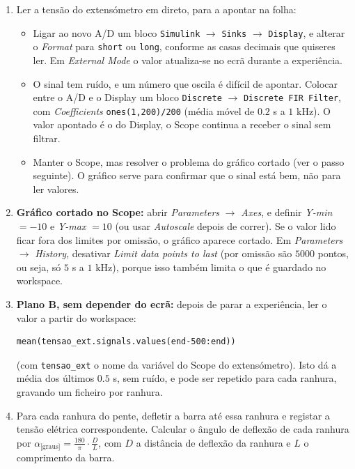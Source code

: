 \documentclass[a4paper,11pt]{article}
\begin{document}
\begin{enumerate}[label=$\square$, leftmargin=1.5em]
  \item Ler a tensão do extensómetro em direto, para a apontar na folha:
  \begin{itemize}
    \item Ligar ao novo A/D um bloco \texttt{Simulink} $\to$ \texttt{Sinks} $\to$
    \texttt{Display}, e alterar o \emph{Format} para \texttt{short} ou
    \texttt{long}, conforme as casas decimais que quiseres ler. Em \emph{External
    Mode} o valor atualiza-se no ecrã durante a experiência.
    \item O sinal tem ruído, e um número que oscila é difícil de apontar. Colocar
    entre o A/D e o Display um bloco \texttt{Discrete} $\to$ \texttt{Discrete FIR
    Filter}, com \emph{Coefficients} \texttt{ones(1,200)/200} (média móvel de
    $0.2$ s a $1$ kHz). O valor apontado é o do Display, o Scope continua a
    receber o sinal sem filtrar.
    \item Manter o Scope, mas resolver o problema do gráfico cortado (ver o
    passo seguinte). O gráfico serve para confirmar que o sinal está bem, não para
    ler valores.
  \end{itemize}

  \item \textbf{Gráfico cortado no Scope:} abrir \emph{Parameters} $\to$
  \emph{Axes}, e definir \emph{Y-min} $= -10$ e \emph{Y-max} $= 10$ (ou usar
  \emph{Autoscale} depois de correr). Se o valor lido ficar fora dos limites por
  omissão, o gráfico aparece cortado. Em \emph{Parameters} $\to$ \emph{History},
  desativar \emph{Limit data points to last} (por omissão são $5000$ pontos, ou
  seja, só $5$ s a $1$ kHz), porque isso também limita o que é guardado no
  workspace.

  \item \textbf{Plano B, sem depender do ecrã:} depois de parar a experiência,
  ler o valor a partir do workspace:
  \begin{verbatim}
mean(tensao_ext.signals.values(end-500:end))
  \end{verbatim}
  (com \texttt{tensao\_ext} o nome da variável do Scope do extensómetro). Isto dá
  a média dos últimos $0.5$ s, sem ruído, e pode ser repetido para cada ranhura,
  gravando um ficheiro por ranhura.

  \item Para cada ranhura do pente, defletir a barra até essa ranhura e registar a
  tensão elétrica correspondente. Calcular o ângulo de deflexão de cada ranhura por
  $\alpha_{\text{[graus]}} = \frac{180}{\pi} \cdot \frac{D}{L}$, com $D$ a distância
  de deflexão da ranhura e $L$ o comprimento da barra.


\end{enumerate}
\end{document}
